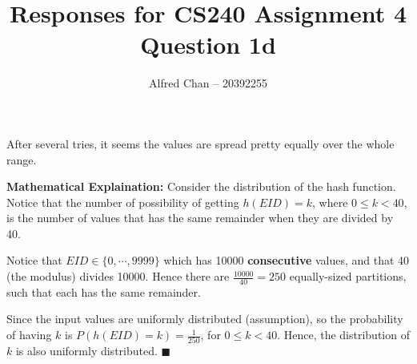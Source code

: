\documentclass[12pt]{article}
\title{Responses for CS240 Assignment 4 Question 1d}
\author{Alfred Chan -- 20392255}
\begin{document}
\maketitle
After several tries, it seems the values are spread pretty equally over the whole range.

{\bf Mathematical Explaination:} Consider the distribution of the hash function.
Notice that the number of possibility of getting $h(EID) = k$,
where $0 \le k < 40$, is the number of values that has the same remainder when they are divided by 40.

Notice that $EID \in \{0,\cdots,9999\}$ which has 10000 {\bf consecutive} values,
and that 40 (the modulus) divides 10000. Hence there are $\frac{10000}{40}=250$ equally-sized partitions,
such that each has the same remainder.

Since the input values are uniformly distributed (assumption), so the probability of having $k$ is $P(h(EID) = k) = \frac{1}{250}$, for $0 \le k < 40$.
Hence, the distribution of $k$ is also uniformly distributed.
\hfill $\blacksquare$
\end{document}

